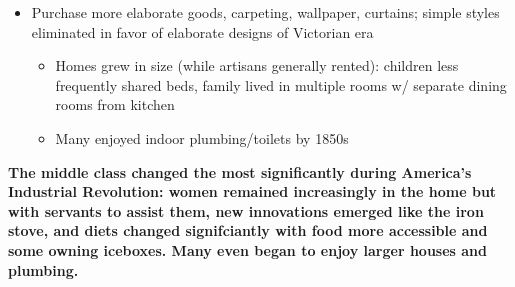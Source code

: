\documentclass[a4paper]{article}
\begin{document}
{{\begin{itemize}
            \begin{itemize}
                \item Food more available due to rail transport: although fruits/veg. still difficult, meats/grains/dairy remained grew in popularity
                \item Some even purchased iceboxes (but most families used salt/sugar)
                \item Diet far more startchy -> middle-classes heavier than today
            \end{itemize}
        \item Purchase more elaborate goods, carpeting, wallpaper, curtains; simple styles eliminated in favor of elaborate designs of Victorian era 
        \begin{itemize}
            \item Homes grew in size (while artisans generally rented): children less frequently shared beds, family lived in multiple rooms w/ separate dining rooms from kitchen
            \item Many enjoyed indoor plumbing/toilets by 1850s
        \end{itemize}
    \end{itemize}
    \textbf{The middle class changed the most significantly during America's Industrial Revolution: women remained increasingly in the home but with servants to assist them, new innovations emerged like the iron stove, and diets changed signifciantly with food more accessible and some owning iceboxes. Many even began to enjoy larger houses and plumbing.}}}
\end{document}
